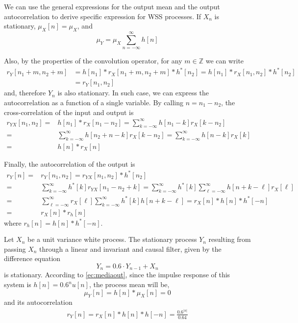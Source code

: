 We can use the general expressions for the output mean and the output autocorrelation to derive specific expression for  WSS processes. If $X_n$ is stationary, $\mu_X[n]=\mu_X$, and
\begin{equation}
  \mu_Y = \mu_X \sum_{n=-\infty}^{\infty} h[n]
  \label{mediaout_stationary}
\end{equation}

Also, by the properties of the convolution operator, for any $m\in \mathbb{Z}$ we can write
\begin{align}
r_Y[n_1 + m, n_2 + m]
	&= h[n_1]*r_X[n_1 + m, n_2 + m]*h^*[n_2]
	= h[n_1]*r_X[n_1, n_2]*h^*[n_2]  \nonumber\\
	&= r_Y[n_1, n_2]
\end{align}
and, therefore $Y_n$ is also stationary. In such case, we can express the autocorrelation as a function of a single variable. By calling $n=n_1-n_2$, the cross-correlation of the input and output is
\begin{align}
r_{YX}[n_1, n_2] 
    =& h[n_1] \ast r_X[n_1 - n_2]
    = \sum_{k=-\infty}^{\infty} h[n_1 - k] r_X[k - n_2]  \nonumber \\
    =& \sum_{k=-\infty}^{\infty} h[n_2 + n - k] r_X[k - n_2]
    = \sum_{k=-\infty}^{\infty} h[n - k] r_X[k] \nonumber \\
    =& h[n] \ast r_X[n]
  \label{RvuStationary}
\end{align}

Finally, the autocorrelation of the output is
\begin{align}
r_Y[n] 
	=& r_Y[n_1, n_2] = r_{YX}[n_1, n_2] \ast h^*[n_2]   \nonumber \\
  	=& \sum_{k=-\infty}^{\infty} h^*[k] r_{YX}[n_1-n_2+k]  
  	= \sum_{k=-\infty}^{\infty} h^*[k]
  	   \sum_{\ell=-\infty}^{\infty} h[n+k-\ell] r_X[\ell] \nonumber \\
    =& \sum_{\ell=-\infty}^{\infty} r_X[\ell]
       \sum_{k=-\infty}^{\infty} h^*[k] h[n + k - \ell] 
  	= r_X[n]*h[n]*h^*[-n] \nonumber \\
  	=& r_X[n]*r_h[n]
  \label{RvvStationary}
\end{align}
where $r_h[n]=h[n]*h^*[-n]$.


\begin{example}
  \label{eg:v_estac_ergod}
Let $X_n$ be a unit variance white process. The stationary process $Y_n$ resulting from passing $X_n$ through a linear and invariant and causal filter, given by the difference equation
  \begin{equation}
    Y_n = 0.6 \cdot Y_{n-1} + X_n
  \end{equation}
is stationary. According to \eqref{ec:mediaout}, since the impulse response of this system is $h[n]=0.6^n u[n]$, the process mean will be, 
\begin{equation}
\mu_Y[n] = h[n]*\mu_X[n] = 0
\label{ec:meanv_mediate}
\end{equation}
and its autocorrelation
\begin{eqnarray}
r_Y[n] = r_X[n]*h[n]*h[-n] = \frac{0.6^{|n|}}{0.64}
\label{ec:Rvv_Rrr}
\end{eqnarray}
\end{example}


